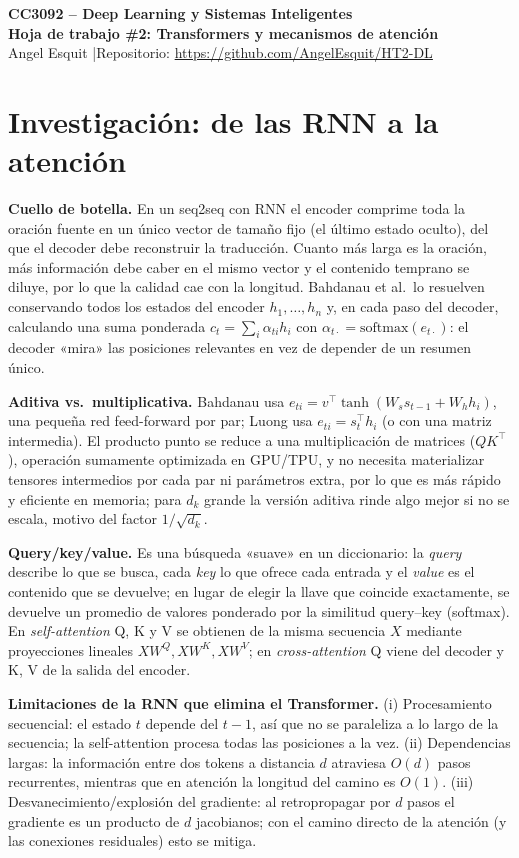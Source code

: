 \documentclass[10pt,letterpaper]{article}
\begin{document}
\begin{center}
{\large\bfseries CC3092 -- Deep Learning y Sistemas Inteligentes}\\
{\large\bfseries Hoja de trabajo \#2: Transformers y mecanismos de atención}\\[2pt]
Angel Esquit \quad|\quad Repositorio: \url{https://github.com/AngelEsquit/HT2-DL}
\end{center}

\section{Investigación: de las RNN a la atención}
\textbf{Cuello de botella.} En un seq2seq con RNN el encoder comprime toda la oración fuente en un único vector de tamaño fijo (el último estado oculto), del que el decoder debe reconstruir la traducción. Cuanto más larga es la oración, más información debe caber en el mismo vector y el contenido temprano se diluye, por lo que la calidad cae con la longitud. Bahdanau et al.\ lo resuelven conservando todos los estados del encoder $h_1,\dots,h_n$ y, en cada paso del decoder, calculando una suma ponderada $c_t=\sum_i \alpha_{ti}h_i$ con $\alpha_{t\cdot}=\mathrm{softmax}(e_{t\cdot})$: el decoder «mira» las posiciones relevantes en vez de depender de un resumen único.

\textbf{Aditiva vs.\ multiplicativa.} Bahdanau usa $e_{ti}=v^\top\tanh(W_s s_{t-1}+W_h h_i)$, una pequeña red feed-forward por par; Luong usa $e_{ti}=s_t^\top h_i$ (o con una matriz intermedia). El producto punto se reduce a una multiplicación de matrices ($QK^\top$), operación sumamente optimizada en GPU/TPU, y no necesita materializar tensores intermedios por cada par ni parámetros extra, por lo que es más rápido y eficiente en memoria; para $d_k$ grande la versión aditiva rinde algo mejor si no se escala, motivo del factor $1/\sqrt{d_k}$.

\textbf{Query/key/value.} Es una búsqueda «suave» en un diccionario: la \emph{query} describe lo que se busca, cada \emph{key} lo que ofrece cada entrada y el \emph{value} es el contenido que se devuelve; en lugar de elegir la llave que coincide exactamente, se devuelve un promedio de valores ponderado por la similitud query--key (softmax). En \emph{self-attention} Q, K y V se obtienen de la misma secuencia $X$ mediante proyecciones lineales $XW^Q, XW^K, XW^V$; en \emph{cross-attention} Q viene del decoder y K, V de la salida del encoder.

\textbf{Limitaciones de la RNN que elimina el Transformer.} (i) Procesamiento secuencial: el estado $t$ depende del $t-1$, así que no se paraleliza a lo largo de la secuencia; la self-attention procesa todas las posiciones a la vez. (ii) Dependencias largas: la información entre dos tokens a distancia $d$ atraviesa $O(d)$ pasos recurrentes, mientras que en atención la longitud del camino es $O(1)$. (iii) Desvanecimiento/explosión del gradiente: al retropropagar por $d$ pasos el gradiente es un producto de $d$ jacobianos; con el camino directo de la atención (y las conexiones residuales) esto se mitiga.
\end{document}
